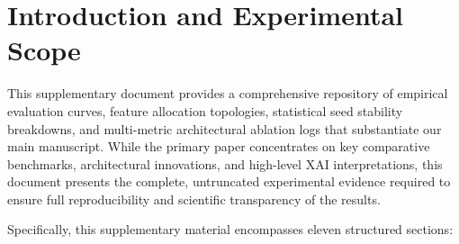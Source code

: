 \documentclass[a4paper,fleqn]{cas-sc}
\begin{document}
\section{Introduction and Experimental Scope}
\label{sec:supp_introduction}

This supplementary document provides a comprehensive repository of empirical evaluation curves, feature allocation topologies, statistical seed stability breakdowns, and multi-metric architectural ablation logs that substantiate our main manuscript. While the primary paper concentrates on key comparative benchmarks, architectural innovations, and high-level XAI interpretations, this document presents the complete, untruncated experimental evidence required to ensure full reproducibility and scientific transparency of the results.

Specifically, this supplementary material encompasses eleven structured sections:
\end{document}
